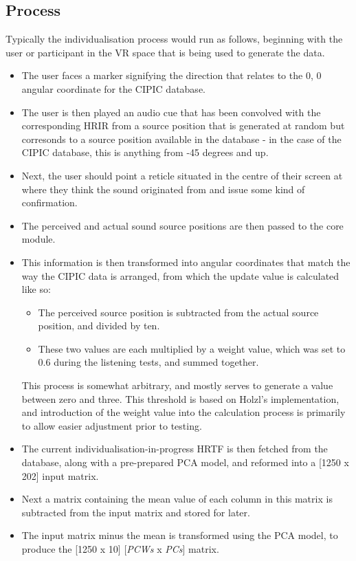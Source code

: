 \subsection{Process}
Typically the individualisation process would run as follows, beginning with the user or participant in the VR space that is being used to generate the data. 

\begin{itemize}
\item The user faces a marker signifying the direction that relates to the 0, 0 angular coordinate for the CIPIC database.
\item The user is then played an audio cue that has been convolved with the corresponding HRIR from a source position that is generated at random but corresonds to a source position available in the database - in the case of the CIPIC database, this is anything from -45 degrees and up.
\item  Next, the user should point a reticle situated in the centre of their screen at where they think the sound originated from and issue some kind of confirmation. 
\item The perceived and actual sound source positions are then passed to the core module.
\item This information is then transformed into angular coordinates that match the way the CIPIC data is arranged, from which the update value is calculated like so:
\begin{itemize}
\item The perceived source position is subtracted from the actual source position, and divided by ten. 
\item These two values are each multiplied by a weight value, which was set to 0.6 during the listening tests, and summed together. 
\end{itemize}
This process is somewhat arbitrary, and mostly serves to generate a value between zero and three. This threshold is based on Holzl's implementation, and introduction of the weight value into the calculation process is primarily to allow easier adjustment prior to testing. 
\item The current individualisation-in-progress HRTF is then fetched from the database, along with a pre-prepared PCA model, and reformed into a [1250 x 202] input matrix. 
\item Next a matrix containing the mean value of each column in this matrix is subtracted from the input matrix and stored for later. 
\item The input matrix minus the mean is transformed using the PCA model, to produce the [1250 x 10] [\textit{PCWs} x \textit{PCs}] matrix. 

\end{itemize}

